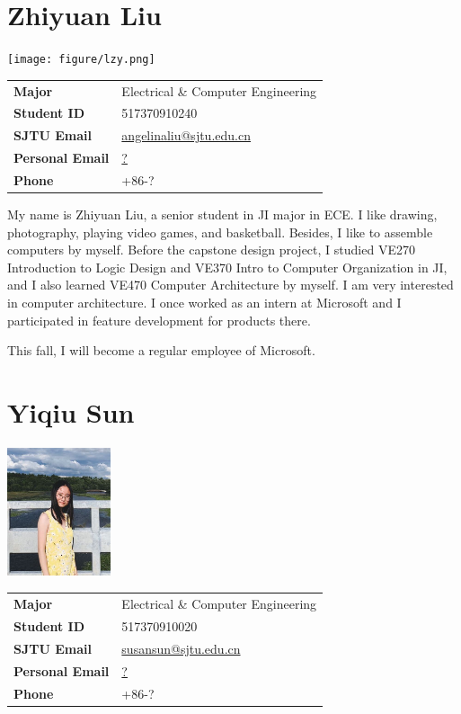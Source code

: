 \section{Zhiyuan Liu}

\begin{minipage}{0.25\textwidth}
  \texttt{[image: figure/lzy.png]}
\end{minipage}
\begin{minipage}{0.75\textwidth}\raggedright
  \begin{tabular}{l l}
    \textbf{Major}          & Electrical \& Computer Engineering \\
    \textbf{Student ID}     & 517370910240 \\
    \textbf{SJTU Email}     & \url{angelinaliu@sjtu.edu.cn} \\
    \textbf{Personal Email} & \url{?} \\
    \textbf{Phone}          & +86-?
  \end{tabular}
\end{minipage}

My name is Zhiyuan Liu, a senior student in JI major in ECE. I like drawing, photography, playing video games, and basketball. Besides, I like to assemble computers by myself. Before the capstone design project, I studied VE270 Introduction to Logic Design and VE370 Intro to Computer Organization in JI, and I also learned VE470 Computer Architecture by myself. I am very interested in computer architecture. I once worked as an intern at Microsoft and I participated in feature development for products there.

This fall, I will become a regular employee of Microsoft.


\section{Yiqiu Sun}

\begin{minipage}{0.25\textwidth}
  \includegraphics[width=1.2in,height=1.5in,clip,keepaspectratio]{figure/syq.jpeg}
\end{minipage}
\begin{minipage}{0.75\textwidth}\raggedright
  \begin{tabular}{l l}
    \textbf{Major}          & Electrical \& Computer Engineering \\
    \textbf{Student ID}     & 517370910020 \\
    \textbf{SJTU Email}     & \url{susansun@sjtu.edu.cn} \\
    \textbf{Personal Email} & \url{?} \\
    \textbf{Phone}          & +86-?
  \end{tabular}
\end{minipage}

